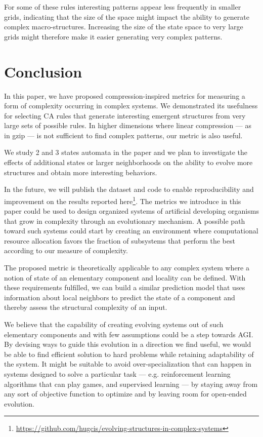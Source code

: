 For some of these rules interesting patterns appear less frequently in smaller
grids, indicating that the size of the space might impact the ability to
generate complex macro-structures. Increasing the size of the state space to
very large grids might therefore make it easier generating very complex patterns.

\section{Conclusion}\label{sec:conclusion}

In this paper, we have proposed compression-inspired metrics for measuring a
form of complexity occurring in complex systems. We demonstrated its usefulness
for selecting CA rules that generate interesting emergent structures from very
large sets of possible rules. In higher dimensions where linear compression ---
as in gzip --- is not sufficient to find complex patterns, our metric is also
useful.

We study 2 and 3 states automata in the paper and we plan to investigate the
effects of additional states or larger neighborhoods on the ability to evolve
more structures and obtain more interesting behaviors.

In the future, we will publish the dataset and code to enable reproducibility
and improvement on the results reported
here\footnote{\url{https://github.com/hugcis/evolving-structures-in-complex-systems}}.
The metrics we introduce in this paper could be used to design organized systems
of artificial developing organisms that grow in complexity through an
evolutionary mechanism. A possible path toward such systems could start by
creating an environment where computational resource allocation favors the
fraction of subsystems that perform the best according to our measure of
complexity.

The proposed metric is theoretically applicable to any complex system where a
notion of state of an elementary component and locality can be defined. With
these requirements fulfilled, we can build a similar prediction model that uses
information about local neighbors to predict the state of a component and
thereby assess the structural complexity of an input.

We believe that the capability of creating evolving systems out of such
elementary components and with few assumptions could be a step towards AGI. By
devising ways to guide this evolution in a direction we find useful, we would be
able to find efficient solution to hard problems while retaining adaptability of
the system. It might be suitable to avoid over-specialization that can happen in
systems designed to solve a particular task --- e.g. reinforcement learning
algorithms that can play games, and supervised learning --- by staying away from
any sort of objective function to optimize and by leaving room for open-ended
evolution.

